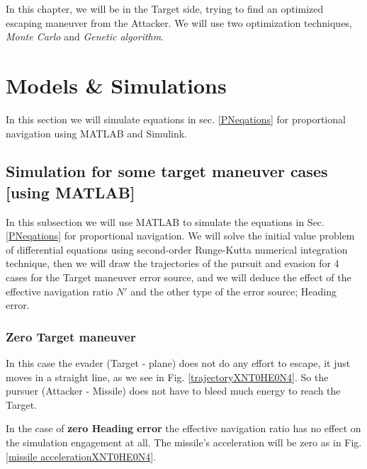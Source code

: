 \label{optimization_EM}

In this chapter, we will be in the Target side, trying  to find an optimized escaping maneuver from the Attacker. We will use two optimization techniques, \textit{Monte Carlo} and \textit{Genetic algorithm}.


\section{Models \& Simulations}

In this section we will simulate equations in sec. \ref{PNeqations} for proportional navigation using MATLAB and Simulink.



\subsection{Simulation for some target maneuver cases [using MATLAB]}
In this subsection we will use MATLAB to simulate the equations in Sec. \ref{PNeqations} for proportional navigation. We will solve the initial value problem of differential equations using second-order Runge-Kutta numerical integration technique, then we will draw the trajectories of the pursuit and evasion for 4 cases for the Target maneuver error source, and we will deduce the effect of the effective navigation ratio $N'$ and the other type of the error source; Heading error. 
\subsubsection{Zero Target maneuver}
In this case the evader (Target - plane) does not do any effort to escape, it just moves in a straight line, as we see in Fig. \ref{trajectoryXNT0HE0N4}. So the pursuer (Attacker - Missile) does not have to bleed much energy to reach the Target.

In the case of \textbf{zero Heading error} the effective navigation ratio has no effect on the simulation engagement at all. The missile's acceleration will be zero as in Fig. \ref{missile accelerationXNT0HE0N4}.

